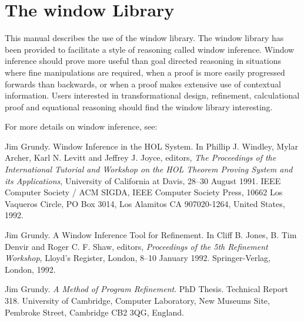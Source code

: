 \chapter{The window Library}

This manual describes the use of the window library.
The window library has been provided to facilitate a style of reasoning called
window inference.
Window inference should prove more useful than goal directed reasoning in
situations where fine manipulations are required,
when a proof is more easily progressed forwards than backwards,
or when a proof makes extensive use of contextual information.
Users interested in transformational design, refinement, calculational proof
and equational reasoning should find the window library interesting.

For more details on window inference, see:
\begin{center}
    \begin{minipage}{0.8\columnwidth}
	\small\noindent
	Jim Grundy.
	Window Inference in the HOL System.
	In Phillip J. Windley, Mylar Archer, Karl N. Levitt and
	Jeffrey J. Joyce, editors,
	{\it The Proceedings of the International Tutorial and Workshop on
	the HOL Theorem Proving System and its Applications},
	University of California at Davis, 28--30 August 1991.
	IEEE Computer Society / ACM SIGDA, IEEE Computer Society Press,
	10662 Los Vaqueros Circle, PO Box 3014,
	Los Alamitos CA 907020-1264, United States, 1992.
    \end{minipage}
\end{center}
\begin{center}
    \begin{minipage}{0.8\columnwidth}
	\small\noindent
	Jim Grundy.
	A Window Inference Tool for Refinement.
	In Cliff B. Jones, B. Tim Denvir and Roger C. F. Shaw, editors,
	{\it Proceedings of the 5th Refinement Workshop},
	Lloyd's Register, London, 8--10 January 1992.
	Springer-$\!$Verlag, London, 1992.
    \end{minipage}
\end{center}
\begin{center}
    \begin{minipage}{0.8\columnwidth}
	\small\noindent
	Jim Grundy.
	{\it A Method of Program Refinement}.
	PhD Thesis.
	Technical Report 318.
	University of Cambridge, Computer Laboratory, New Museums Site,
	Pembroke Street, Cambridge CB2 3QG, England.
    \end{minipage}
\end{center}

